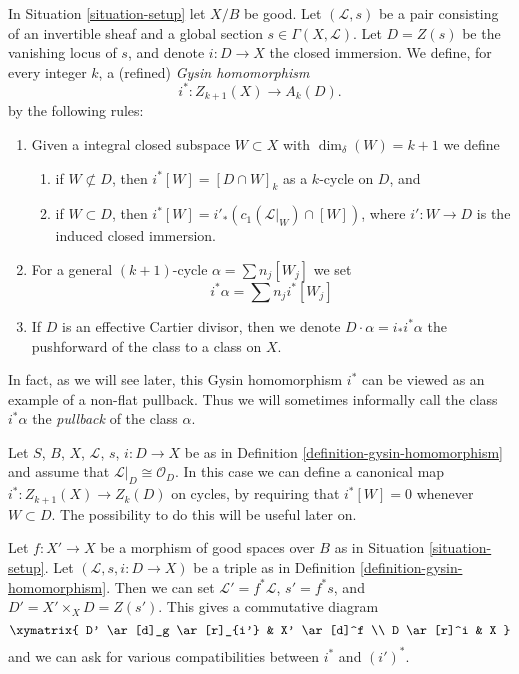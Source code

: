 \begin{definition}
\label{definition-gysin-homomorphism}
In Situation \ref{situation-setup} let $X/B$ be good.
Let $(\mathcal{L}, s)$ be a pair consisting of an invertible
sheaf and a global section $s \in \Gamma(X, \mathcal{L})$.
Let $D = Z(s)$ be the vanishing locus of $s$, and
denote $i : D \to X$ the closed immersion.
We define, for every integer $k$, a (refined) {\it Gysin homomorphism}
$$
i^* : Z_{k + 1}(X) \to A_k(D).
$$
by the following rules:
\begin{enumerate}
\item Given a integral closed subspace $W \subset X$ with
$\dim_\delta(W) = k + 1$ we define
\begin{enumerate}
\item if $W \not \subset D$, then $i^*[W] = [D \cap W]_k$ as a
$k$-cycle on $D$, and
\item if $W \subset D$, then
$i^*[W] = i'_*(c_1(\mathcal{L}|_W) \cap [W])$,
where $i' : W \to D$ is the induced closed immersion.
\end{enumerate}
\item For a general $(k + 1)$-cycle $\alpha = \sum n_j[W_j]$
we set
$$
i^*\alpha = \sum n_j i^*[W_j]
$$
\item If $D$ is an effective Cartier divisor, then we denote
$D \cdot \alpha = i_*i^*\alpha$ the pushforward of
the class to a class on $X$.
\end{enumerate}
\end{definition}

\noindent
In fact, as we will see later, this Gysin homomorphism $i^*$ can be viewed
as an example of a non-flat pullback. Thus we will sometimes informally
call the class $i^*\alpha$ the {\it pullback} of the class $\alpha$.

\begin{remark}
\label{remark-on-cycles}
Let $S$, $B$, $X$, $\mathcal{L}$, $s$, $i : D \to X$ be as in
Definition \ref{definition-gysin-homomorphism} and assume
that $\mathcal{L}|_D \cong \mathcal{O}_D$. In this case we
can define a canonical map $i^* : Z_{k + 1}(X) \to Z_k(D)$
on cycles, by requiring that $i^*[W] = 0$ whenever $W \subset D$.
The possibility to do this will be useful later on.
\end{remark}

\begin{remark}
\label{remark-pullback-pairs}
Let $f : X' \to X$ be a morphism of good spaces over $B$
as in Situation \ref{situation-setup}. Let $(\mathcal{L}, s, i : D \to X)$
be a triple as in Definition \ref{definition-gysin-homomorphism}.
Then we can set $\mathcal{L}' = f^*\mathcal{L}$, $s' = f^*s$, and
$D' = X' \times_X D = Z(s')$. This gives a commutative diagram
$$
\xymatrix{
D' \ar[d]_g \ar[r]_{i'} & X' \ar[d]^f \\
D \ar[r]^i & X
}
$$
and we can ask for various compatibilities between $i^*$ and $(i')^*$.
\end{remark}

